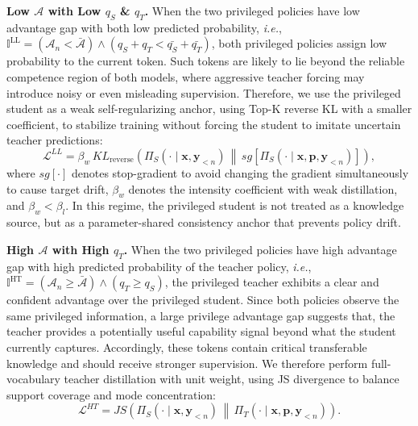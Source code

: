 \documentclass{llmxive}
\begin{document}
\noindent\textbf{Low $\mathcal{A}$ with Low $q_{S}$ \& $q_{T}$.}
When the two privileged policies have low advantage gap with both low predicted probability, \textit{i.e.}, $\mathbb{I}^{\mathrm{LL}}=\left(\mathcal{A}_{n}< \bar{\mathcal{A}} \right)\wedge \left(q_{S} + q_{T} < \bar{q_{S}}  + \bar{q_{T}}\right)$, both privileged policies assign low probability to the current token. 
Such tokens are likely to lie beyond the reliable competence region of both models, where aggressive teacher forcing may introduce noisy or even misleading supervision. 
Therefore, we use the privileged student as a weak self-regularizing anchor, using Top-K reverse KL with a smaller coefficient, to stabilize training without forcing the student to imitate uncertain teacher predictions:
\begin{equation}
    \mathcal{L}^{LL}
    =
    \beta_{w}\,
    KL_{\mathrm{reverse}}
    \left(
        \Pi_{S}\left(\cdot\mid \mathbf{x},\mathbf{y}_{<n}\right)
        \,\middle\|\,
        sg\left[
        \Pi_{S}\left(\cdot\mid \mathbf{x},\mathbf{p},\mathbf{y}_{<n}\right)
        \right]
    \right),
\end{equation}
where $sg[\cdot]$ denotes stop-gradient to avoid changing the gradient simultaneously to cause target drift, $\beta_{w}$ denotes the intensity coefficient with weak distillation, and $\beta_{w} < \beta_{l}$. In this regime, the privileged student is not treated as a knowledge source, but as a parameter-shared consistency anchor that prevents policy drift.



\noindent\textbf{High $\mathcal{A}$ with High $q_{T}$.}
When the two privileged policies have high advantage gap with high predicted probability of the teacher policy, \textit{i.e.}, $\mathbb{I}^{\mathrm{HT}}=\left(\mathcal{A}_{n} \geq \bar{\mathcal{A}} \right) \wedge \left(q_{T} \geq q_{S}\right)$, the privileged teacher exhibits a clear and confident advantage over the privileged student. 
Since both policies observe the same privileged information, a large privilege advantage gap suggests that, the teacher provides a potentially useful capability signal beyond what the student currently captures.
Accordingly, these tokens contain critical transferable knowledge and should receive stronger supervision. 
We therefore perform full-vocabulary teacher distillation with unit weight, using JS divergence to balance support coverage and mode concentration:
\begin{equation}
    \mathcal{L}^{HT}
    =
    JS
    \left(
        \Pi_{S}\left(\cdot\mid \mathbf{x},\mathbf{y}_{<n}\right)
        \,\middle\|\,
        \Pi_{T}\left(\cdot\mid \mathbf{x},\mathbf{p},\mathbf{y}_{<n}\right)
    \right).
\end{equation}
\end{document}
